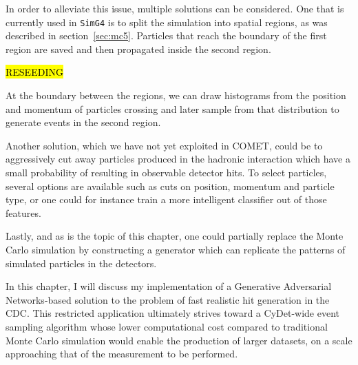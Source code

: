 
In order to alleviate this issue, multiple solutions can be considered. One that is currently used in \texttt{SimG4} is to split the simulation into spatial regions, as was described in section~\ref{sec:mc5}. Particles that reach the boundary of the first region are saved and then propagated inside the second region. 

\hl{RESEEDING}

At the boundary between the regions, we can draw histograms from the position and momentum of particles crossing and later sample from that distribution to generate events in the second region.

Another solution, which we have not yet exploited in COMET, could be to aggressively cut away particles produced in the hadronic interaction which have a small probability of resulting in observable detector hits. To select particles, several options are available such as cuts on position, momentum and particle type, or one could for instance train a more intelligent classifier out of those features.

Lastly, and as is the topic of this chapter, one could partially replace the Monte Carlo simulation by constructing %
a generator which can replicate the patterns of simulated particles in the detectors.

In this chapter, I will discuss my implementation of a Generative Adversarial Networks-based solution to the problem of fast realistic hit generation in the CDC. This restricted application ultimately strives toward a CyDet-wide event sampling algorithm whose lower computational cost compared to traditional Monte Carlo simulation would enable the production of larger datasets, on a scale approaching that of the measurement to be performed.

